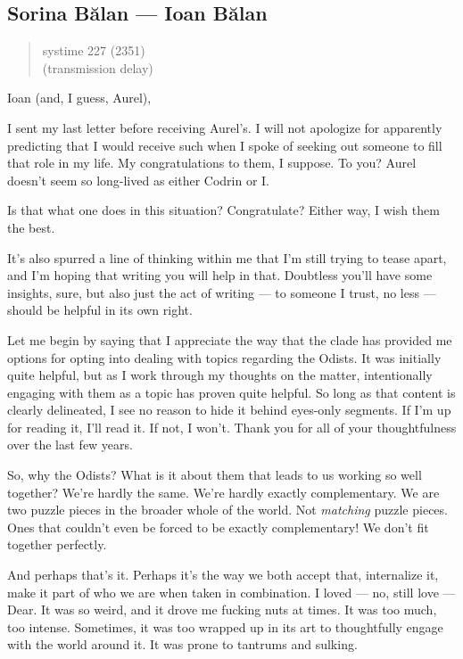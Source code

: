 \hypertarget{sorina-bux103lan-ioan-bux103lan}{%
\subsection{Sorina Bălan — Ioan Bălan}\label{sorina-bux103lan-ioan-bux103lan}}

\begin{quote}
systime 227 (2351)\\
(transmission delay)
\end{quote}

Ioan (and, I guess, Aurel),

I sent my last letter before receiving Aurel's. I will not apologize for apparently predicting that I would receive such when I spoke of seeking out someone to fill that role in my life. My congratulations to them, I suppose. To you? Aurel doesn't seem so long-lived as either Codrin or I.

Is that what one does in this situation? Congratulate? Either way, I wish them the best.

It's also spurred a line of thinking within me that I'm still trying to tease apart, and I'm hoping that writing you will help in that. Doubtless you'll have some insights, sure, but also just the act of writing — to someone I trust, no less — should be helpful in its own right.

Let me begin by saying that I appreciate the way that the clade has provided me options for opting into dealing with topics regarding the Odists. It was initially quite helpful, but as I work through my thoughts on the matter, intentionally engaging with them as a topic has proven quite helpful. So long as that content is clearly delineated, I see no reason to hide it behind eyes-only segments. If I'm up for reading it, I'll read it. If not, I won't. Thank you for all of your thoughtfulness over the last few years.

So, why the Odists? What is it about them that leads to us working so well together? We're hardly the same. We're hardly exactly complementary. We are two puzzle pieces in the broader whole of the world. Not \emph{matching} puzzle pieces. Ones that couldn't even be forced to be exactly complementary! We don't fit together perfectly.

And perhaps that's it. Perhaps it's the way we both accept that, internalize it, make it part of who we are when taken in combination. I loved — no, still love — Dear. It was so weird, and it drove me fucking nuts at times. It was too much, too intense. Sometimes, it was too wrapped up in its art to thoughtfully engage with the world around it. It was prone to tantrums and sulking.

